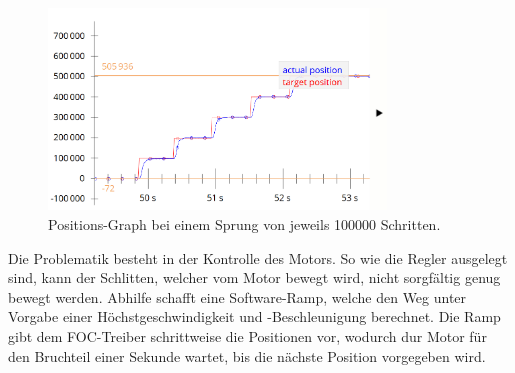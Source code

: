 \begin{figure}[H]
\center
\includegraphics[width = 0.8\textwidth]{graphics/PI_Position_graph_0}
\caption{Positions-Graph bei einem Sprung von jeweils 100000 Schritten.}
\label{fig:PI_Position_graph_0}
\end{figure}

Die Problematik besteht in der Kontrolle des Motors. So wie die Regler ausgelegt sind, kann der Schlitten, welcher vom Motor bewegt wird, nicht sorgfältig genug bewegt werden. Abhilfe schafft eine Software-Ramp, welche den Weg unter Vorgabe einer Höchstgeschwindigkeit und -Beschleunigung berechnet. Die Ramp gibt dem FOC-Treiber schrittweise die Positionen vor, wodurch dur Motor für den Bruchteil einer Sekunde wartet, bis die nächste Position vorgegeben wird.